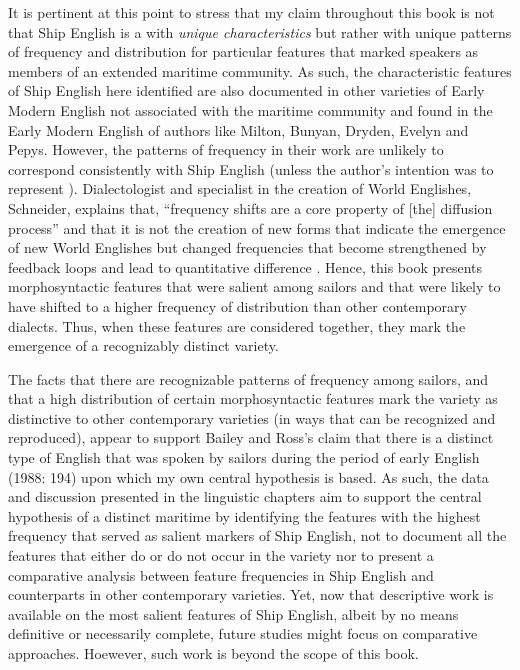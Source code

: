 It is pertinent at this point to stress that my claim throughout this book is not that Ship English is a  with \textit{unique characteristics} but rather with unique patterns of frequency and distribution for particular features that marked speakers as members of an extended maritime community. As such, the characteristic features of Ship English here identified are also documented in other varieties of Early Modern English not associated with the maritime community and found in the Early Modern English of authors like Milton, Bunyan, Dryden, Evelyn and Pepys. However, the patterns of frequency in their work are unlikely to correspond consistently with Ship English (unless the author’s intention was to represent ). Dialectologist and specialist in the creation of World Englishes, Schneider, explains that, “frequency shifts are a core property of [the] diffusion process” and that it is not the creation of new forms that indicate the emergence of new World Englishes but changed frequencies that become strengthened by feedback loops and lead to quantitative difference \citep{Schneider2018}. Hence, this book presents morphosyntactic features that were salient among sailors and that were likely to have shifted to a higher frequency of distribution than other contemporary dialects. Thus, when these features are considered together, they mark the emergence of a recognizably distinct variety. 

The facts that there are recognizable patterns of frequency among sailors, and that a high distribution of certain morphosyntactic features mark the variety as distinctive to other contemporary varieties (in ways that can be recognized and reproduced), appear to support Bailey and Ross’s claim that there is a distinct type of English that was spoken by sailors during the period of early English  (1988: 194) upon which my own central hypothesis is based. As such, the data and discussion presented in the linguistic chapters aim to support the central hypothesis of a distinct maritime  by identifying the features with the highest frequency that served as salient markers of Ship English, not to document all the features that either do or do not occur in the variety nor to present a comparative analysis between feature frequencies in Ship English and counterparts in other contemporary varieties. Yet, now that descriptive work is available on the most salient features of Ship English, albeit by no means definitive or necessarily complete, future studies might focus on comparative approaches. Hoewever, such work is beyond the scope of this book. 

